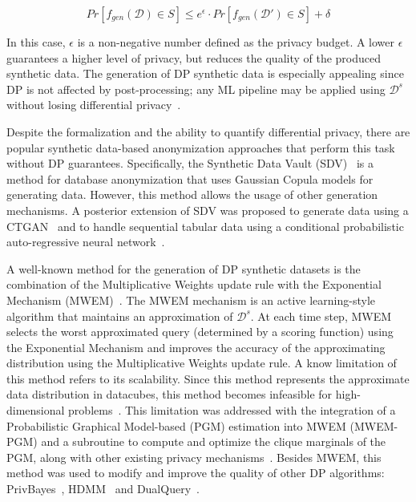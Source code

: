 \documentclass[parskip=full]{scrartcl}
\begin{document}
\begin{equation}
    Pr[f_{gen}(\mathcal{D}) \in S] \le e^{\epsilon} \cdot
    Pr[f_{gen}(\mathcal{D}') \in S] + \delta
\end{equation}
 
In this case, $\epsilon$ is a non-negative number defined as the privacy
budget. A lower $\epsilon$ guarantees a higher level of privacy, but reduces
the quality of the produced synthetic data. The generation of DP synthetic
data is especially appealing since DP is not affected by post-processing; any
ML pipeline may be applied using $\mathcal{D}^s$ without losing differential
privacy~\cite{dwork2014algorithmic}.

Despite the formalization and the ability to quantify differential privacy,
there are popular synthetic data-based anonymization approaches that perform
this task without DP guarantees. Specifically, the Synthetic Data Vault
(SDV)~\cite{patki2016synthetic} is a method for database anonymization that
uses Gaussian Copula models for generating data. However, this method allows
the usage of other generation mechanisms. A posterior extension of SDV was
proposed to generate data using a CTGAN~\cite{xu2019modeling} and to handle
sequential tabular data using a conditional probabilistic auto-regressive
neural network~\cite{zhang2022sequential}. 

A well-known method for the generation of DP synthetic datasets is the
combination of the Multiplicative Weights update rule with the Exponential
Mechanism (MWEM)~\cite{hardt2012simple}. The MWEM mechanism is an active
learning-style algorithm that maintains an approximation of $\mathcal{D}^s$.
At each time step, MWEM selects the worst approximated query (determined by a
scoring function) using the Exponential Mechanism and improves the accuracy of
the approximating distribution using the Multiplicative Weights update rule.
A know limitation of this method refers to its scalability. Since this method
represents the approximate data distribution in datacubes, this method becomes
infeasible for high-dimensional problems~\cite{mckenna2019graphical}. This
limitation was addressed with the integration of a Probabilistic Graphical
Model-based (PGM) estimation into MWEM (MWEM-PGM) and a subroutine to compute
and optimize the clique marginals of the PGM, along with other existing
privacy mechanisms~\cite{mckenna2019graphical}. Besides MWEM, this method was
used to modify and improve the quality of other DP algorithms:
PrivBayes~\cite{zhang2017privbayes}, HDMM~\cite{mckenna2018optimizing} and
DualQuery~\cite{gaboardi2014dual}.
\end{document}
